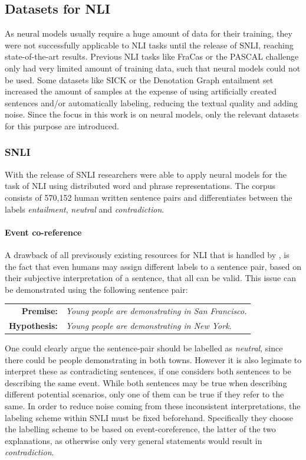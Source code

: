 \subsection{Datasets for NLI}\label{sec:basics_datasets}
As neural models usually require a huge amount of data for their training, they were not successfully applicable to \ac{NLI} tasks until the release of \ac{SNLI}, reaching state-of-the-art results. Previous \ac{NLI} tasks like FraCas \citep{cooper1996using} or the PASCAL challenge \citep{dagan2006pascal} only had very limited amount of training data, such that neural models could not be used. Some datasets like \ac{SICK} \citep{marelli2014semeval} or the Denotation Graph entailment set \citep{young2014image} increased the amount of samples at the expense of using artificially created sentences and/or automatically labeling, reducing the textual quality and adding noise. Since the focus in this work is on neural models, only the relevant datasets for this purpose are introduced.
\subsubsection{SNLI}\label{sec:snli}
With the release of \ac{SNLI} \citep{bowman2015large} researchers were able to apply neural models for the task of \ac{NLI} using distributed word and phrase representations. The corpus consists of 570,152 human written sentence pairs and differentiates between the labels \textit{entailment}, \textit{neutral} and \textit{contradiction}. 
\paragraph*{Event co-reference}
A drawback of all previsously existing resources for \ac{NLI} that is handled by \cite{bowman2015large}, is the fact that even humans may assign different labels to a sentence pair, based on their subjective interpretation of a sentence, that all can be valid. This issue can be demonstrated using the following sentence pair:
\begin{center}
\begin{tabular}{rl}
\textbf{Premise:} & \textit{Young people are demonstrating in San Francisco.}
\\
\textbf{Hypothesis:} & \textit{Young people are demonstrating in New York.}
\end{tabular}
\end{center}
One could clearly argue the sentence-pair should be labelled as \textit{neutral}, since there could be people demonstrating in both towns. However it is also legimate to interpret these as contradicting sentences, if one considers both sentences to be describing the same event. While both sentences may be true when describing different potential scenarios, only one of them can be true if they refer to the same. In order to reduce noise coming from these inconsistent interpretations, the labeling scheme within \ac{SNLI} must be fixed beforehand. Specifically they choose the labelling scheme to be based on event-coreference, the latter of the two explanations, as otherwise only very general statements would result in \textit{contradiction}.
